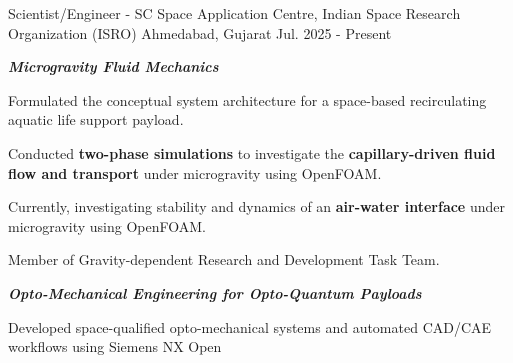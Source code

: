 

\begin{cventries}
   \cventry
   {Scientist/Engineer - SC} %
   {Space Application Centre, Indian Space Research Organization (ISRO)} %
   {Ahmedabad, Gujarat} %
   {Jul. 2025 - Present} %
   {
    \emph{\textbf{Microgravity Fluid Mechanics}}
    \vspace{0.5cm}
    \begin{cvitems} %
      \item {Formulated the conceptual system architecture for a space-based recirculating aquatic life support payload.}
      \item {Conducted \textbf{two-phase simulations} to investigate the \textbf{capillary-driven fluid flow and transport} under microgravity using OpenFOAM.}
      \item {Currently, investigating stability and dynamics of an \textbf{air-water interface} under microgravity using OpenFOAM.}
      \item {Member of Gravity-dependent Research and Development Task Team.}
    \end{cvitems}
    \vspace{0.2cm}
    \emph{\textbf{Opto-Mechanical Engineering for Opto-Quantum Payloads}}
    \vspace{0.5cm}
    \begin{cvitems} %
       \item {Developed space-qualified opto-mechanical systems and automated CAD/CAE workflows using Siemens NX Open}
    \end{cvitems}
   }


\end{cventries}
